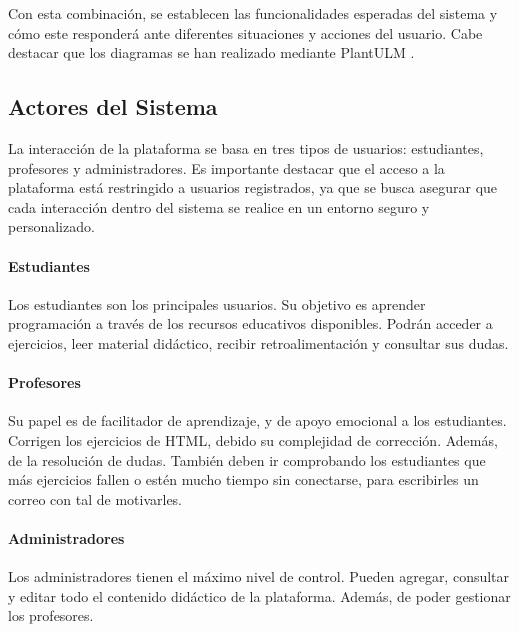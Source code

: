 Con esta combinación, se establecen las funcionalidades esperadas del sistema y cómo este responderá ante diferentes situaciones y acciones del usuario. Cabe destacar que los diagramas se han realizado mediante PlantULM \cite{planttext}. 

\subsection{Actores del Sistema}

La interacción de la plataforma se basa en tres tipos de usuarios: estudiantes, profesores y administradores. Es importante destacar que el acceso a la plataforma está restringido a usuarios registrados, ya que se busca asegurar que cada interacción dentro del sistema se realice en un entorno seguro y personalizado.

\paragraph{Estudiantes} Los estudiantes son los principales usuarios. Su objetivo es aprender programación a través de los recursos educativos disponibles. Podrán acceder a ejercicios, leer material didáctico, recibir retroalimentación y consultar sus dudas.

\paragraph{Profesores} Su papel es de facilitador de aprendizaje, y de apoyo emocional a los estudiantes. Corrigen los ejercicios de HTML, debido su complejidad de corrección. Además, de la resolución de dudas. También deben ir comprobando los estudiantes que más ejercicios fallen o estén mucho tiempo sin conectarse, para escribirles un correo con tal de motivarles. 

\paragraph{Administradores} Los administradores tienen el máximo nivel de control. Pueden agregar, consultar y editar todo el contenido didáctico de la plataforma. Además, de poder gestionar los profesores.

